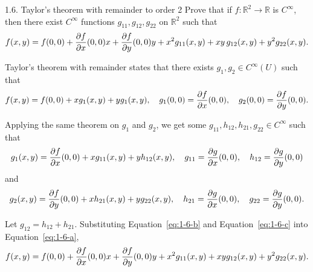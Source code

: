 \begin{problem}{1.6. Taylor's theorem with remainder to order 2}
Prove that if \( f : \mathbb{R}^2 \to \mathbb{R} \) is \( C^\infty \), then there exist \( C^\infty \) functions \( g_{11}, g_{12}, g_{22} \) on \( \mathbb{R}^2 \) such that
\[
    f(x, y) = f(0,0) + \frac{\partial f}{\partial x}(0,0) x + \frac{\partial f}{\partial y}(0,0) y + x^2 g_{11}(x, y) + xy\, g_{12}\/(x, y) + y^2 g_{22}\/(x, y).
\]
\end{problem}

Taylor's theorem with remainder states that there exists $g_1, g_2 \in C^{\infty} (U)$ such that 
\begin{equation} \label{eq:1-6-a}
    f(x, y) = f(0, 0) + xg_1(x, y) + yg_1(x, y), \quad g_1(0, 0) = \pdv{f}{x}\/(0, 0), \quad g_2\/(0, 0) = \pdv{f}{y}\/(0, 0) .
\end{equation}

Applying the same theorem on $g_1$ and $g_2$, we get some $g_{11}, h_{12}, h_{21}, g_{22} \in C^{\infty}$ such that
\begin{equation} \label{eq:1-6-b}
    g_1(x, y) = \pdv{f}{x}\/(0, 0) + xg_{11}(x,y) + yh_{12}(x, y), \quad g_{11} = \pdv{g}{x} \/(0, 0), \quad h_{12} = \pdv{g}{y} \/(0, 0)
\end{equation}
and
\begin{equation} \label{eq:1-6-c}
    g_2(x, y) = \pdv{f}{y}\/(0, 0) + xh_{21}(x,y) + yg_{22}(x, y), \quad h_{21} = \pdv{g}{x} \/(0, 0), \quad g_{22} = \pdv{g}{y} \/(0, 0) .
\end{equation}

Let $g_{12} = h_{12} + h_{21}$.
Substituting Equation~\ref{eq:1-6-b} and Equation~\ref{eq:1-6-c} into Equation~\ref{eq:1-6-a}, 
\begin{equation}
    f(x, y) = f(0, 0) + \pdv{f}{x}\/(0, 0)x + \pdv{f}{y}\/(0, 0)y + x^2g_{11}(x,y) + xyg_{12}(x, y) + y^2g_{22}(x, y) .
\end{equation}